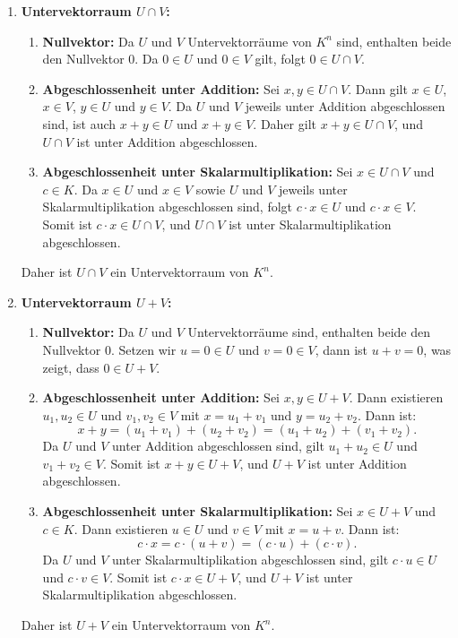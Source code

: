 \documentclass[11pt]{article}
\begin{document}
\begin{enumerate}
    \item \textbf{Untervektorraum \( U \cap V \):}
    \begin{enumerate}
        \item \textbf{Nullvektor:} Da \( U \) und \( V \) Untervektorräume von \( K^n \) sind, enthalten beide den Nullvektor \( 0 \). Da \( 0 \in U \) und \( 0 \in V \) gilt, folgt \( 0 \in U \cap V \).

        \item \textbf{Abgeschlossenheit unter Addition:} Sei \( x, y \in U \cap V \). Dann gilt \( x \in U \), \( x \in V \), \( y \in U \) und \( y \in V \). Da \( U \) und \( V \) jeweils unter Addition abgeschlossen sind, ist auch \( x + y \in U \) und \( x + y \in V \). Daher gilt \( x + y \in U \cap V \), und \( U \cap V \) ist unter Addition abgeschlossen.

        \item \textbf{Abgeschlossenheit unter Skalarmultiplikation:} Sei \( x \in U \cap V \) und \( c \in K \). Da \( x \in U \) und \( x \in V \) sowie \( U \) und \( V \) jeweils unter Skalarmultiplikation abgeschlossen sind, folgt \( c \cdot x \in U \) und \( c \cdot x \in V \). Somit ist \( c \cdot x \in U \cap V \), und \( U \cap V \) ist unter Skalarmultiplikation abgeschlossen.
    \end{enumerate}
    Daher ist \( U \cap V \) ein Untervektorraum von \( K^n \).

    \item \textbf{Untervektorraum \( U + V \):}
    \begin{enumerate}
        \item \textbf{Nullvektor:} Da \( U \) und \( V \) Untervektorräume sind, enthalten beide den Nullvektor \( 0 \). Setzen wir \( u = 0 \in U \) und \( v = 0 \in V \), dann ist \( u + v = 0 \), was zeigt, dass \( 0 \in U + V \).

        \item \textbf{Abgeschlossenheit unter Addition:} Sei \( x, y \in U + V \). Dann existieren \( u_1, u_2 \in U \) und \( v_1, v_2 \in V \) mit \( x = u_1 + v_1 \) und \( y = u_2 + v_2 \). Dann ist:
        \[
        x + y = (u_1 + v_1) + (u_2 + v_2) = (u_1 + u_2) + (v_1 + v_2).
        \]
        Da \( U \) und \( V \) unter Addition abgeschlossen sind, gilt \( u_1 + u_2 \in U \) und \( v_1 + v_2 \in V \). Somit ist \( x + y \in U + V \), und \( U + V \) ist unter Addition abgeschlossen.

        \item \textbf{Abgeschlossenheit unter Skalarmultiplikation:} Sei \( x \in U + V \) und \( c \in K \). Dann existieren \( u \in U \) und \( v \in V \) mit \( x = u + v \). Dann ist:
        \[
        c \cdot x = c \cdot (u + v) = (c \cdot u) + (c \cdot v).
        \]
        Da \( U \) und \( V \) unter Skalarmultiplikation abgeschlossen sind, gilt \( c \cdot u \in U \) und \( c \cdot v \in V \). Somit ist \( c \cdot x \in U + V \), und \( U + V \) ist unter Skalarmultiplikation abgeschlossen.
    \end{enumerate}
    Daher ist \( U + V \) ein Untervektorraum von \( K^n \).
\end{enumerate}
\end{document}
